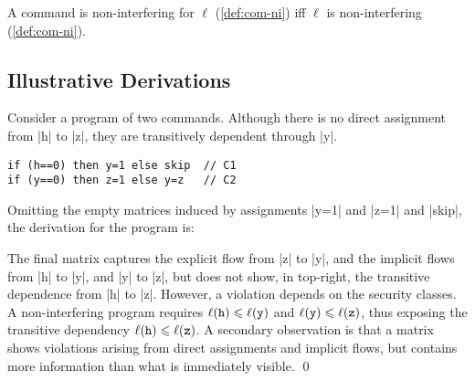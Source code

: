 \begin{conjecture}[Correspondence]
A command %
is non-interfering for \(\ell\) (\autoref{def:com-ni})
iff \(\ell\) is non-interfering (\autoref{def:com-ni}).
\end{conjecture}


\subsection{Illustrative Derivations}
\label{plas-examples}

\begin{example}
Consider a program of two commands.
Although there is no direct assignment from \prc|h| to \prc|z|, they are transitively dependent through \prc|y|.

\begin{lstlisting}[style=C]
if (h==0) then y=1 else skip  // C1
if (y==0) then z=1 else y=z   // C2
\end{lstlisting}
Omitting the empty matrices induced by assignments \prc|y=1| and \prc|z=1| and \prc|skip|, the derivation for the program is:
\begin{center}\end{center}
The final matrix captures the explicit flow from \prc|z| to \prc|y|,
and the implicit flows from \prc|h| to \prc|y|, and \prc|y| to \prc|z|,
but does not show, in top-right, the transitive dependence from \prc|h| to \prc|z|.
However, a violation depends on the security classes.
A non-interfering program requires \(\ell(\mathtt{h}) \leqslant \ell(\mathtt{y})\) and \(\ell(\mathtt{y}) \leqslant \ell(\mathtt{z})\),
thus exposing the transitive dependency $\ell(\mathtt{h}) \leqslant \ell(\mathtt{z})$.
A secondary observation is that a matrix shows violations arising from direct assignments and implicit flows,
but contains more information than what is immediately visible.
\qed
\end{example}

